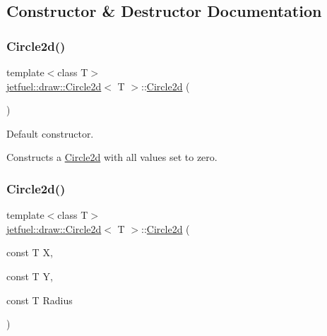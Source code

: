 \subsection{Constructor \& Destructor Documentation}
\mbox{\label{classjetfuel_1_1draw_1_1Circle2d_a265ed4234046e3a5fd669be4f39833bf}} 
\subsubsection{\texorpdfstring{Circle2d()}{Circle2d()}\hspace{0.1cm}{\footnotesize\ttfamily [1/3]}}
{\footnotesize\ttfamily template$<$class T$>$ \\
\hyperlink{classjetfuel_1_1draw_1_1Circle2d}{jetfuel\+::draw\+::\+Circle2d}$<$ T $>$\+::\hyperlink{classjetfuel_1_1draw_1_1Circle2d}{Circle2d} (\begin{DoxyParamCaption}{ }\end{DoxyParamCaption})\hspace{0.3cm}{\ttfamily [inline]}}



Default constructor. 

Constructs a \hyperlink{classjetfuel_1_1draw_1_1Circle2d}{Circle2d} with all values set to zero. \mbox{\label{classjetfuel_1_1draw_1_1Circle2d_a46ba7b221cf32824a92014a856964e15}} 
\subsubsection{\texorpdfstring{Circle2d()}{Circle2d()}\hspace{0.1cm}{\footnotesize\ttfamily [2/3]}}
{\footnotesize\ttfamily template$<$class T$>$ \\
\hyperlink{classjetfuel_1_1draw_1_1Circle2d}{jetfuel\+::draw\+::\+Circle2d}$<$ T $>$\+::\hyperlink{classjetfuel_1_1draw_1_1Circle2d}{Circle2d} (\begin{DoxyParamCaption}\item[{const T}]{X,  }\item[{const T}]{Y,  }\item[{const T}]{Radius }\end{DoxyParamCaption})}



